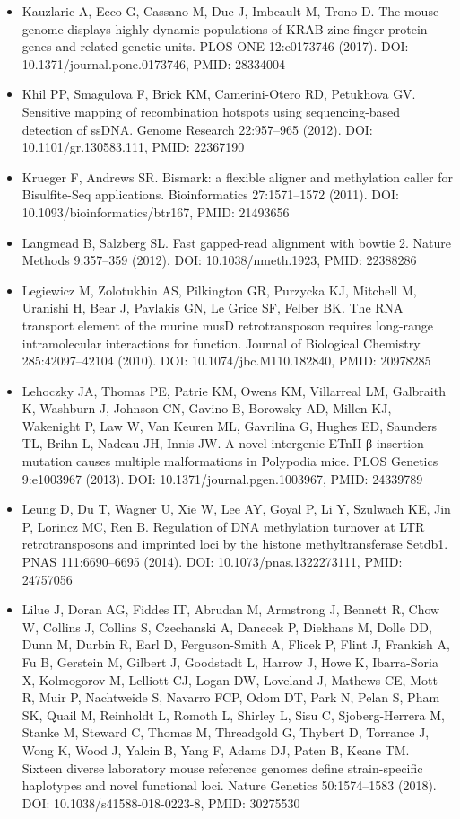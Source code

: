 \documentclass[11pt,a4paper]{article}
\begin{document}
\begin{itemize}
\item Kauzlaric A, Ecco G, Cassano M, Duc J, Imbeault M, Trono D. The mouse genome displays highly dynamic populations of KRAB-zinc finger protein genes and related genetic units. PLOS ONE 12:e0173746 (2017). DOI: 10.1371/journal.pone.0173746, PMID: 28334004
\item Khil PP, Smagulova F, Brick KM, Camerini-Otero RD, Petukhova GV. Sensitive mapping of recombination hotspots using sequencing-based detection of ssDNA. Genome Research 22:957–965 (2012). DOI: 10.1101/gr.130583.111, PMID: 22367190
\item Krueger F, Andrews SR. Bismark: a flexible aligner and methylation caller for Bisulfite-Seq applications. Bioinformatics 27:1571–1572 (2011). DOI: 10.1093/bioinformatics/btr167, PMID: 21493656
\item Langmead B, Salzberg SL. Fast gapped-read alignment with bowtie 2. Nature Methods 9:357–359 (2012). DOI: 10.1038/nmeth.1923, PMID: 22388286
\item Legiewicz M, Zolotukhin AS, Pilkington GR, Purzycka KJ, Mitchell M, Uranishi H, Bear J, Pavlakis GN, Le Grice SF, Felber BK. The RNA transport element of the murine musD retrotransposon requires long-range intramolecular interactions for function. Journal of Biological Chemistry 285:42097–42104 (2010). DOI: 10.1074/jbc.M110.182840, PMID: 20978285
\item Lehoczky JA, Thomas PE, Patrie KM, Owens KM, Villarreal LM, Galbraith K, Washburn J, Johnson CN, Gavino B, Borowsky AD, Millen KJ, Wakenight P, Law W, Van Keuren ML, Gavrilina G, Hughes ED, Saunders TL, Brihn L, Nadeau JH, Innis JW. A novel intergenic ETnII-β insertion mutation causes multiple malformations in Polypodia mice. PLOS Genetics 9:e1003967 (2013). DOI: 10.1371/journal.pgen.1003967, PMID: 24339789
\item Leung D, Du T, Wagner U, Xie W, Lee AY, Goyal P, Li Y, Szulwach KE, Jin P, Lorincz MC, Ren B. Regulation of DNA methylation turnover at LTR retrotransposons and imprinted loci by the histone methyltransferase Setdb1. PNAS 111:6690–6695 (2014). DOI: 10.1073/pnas.1322273111, PMID: 24757056
\item Lilue J, Doran AG, Fiddes IT, Abrudan M, Armstrong J, Bennett R, Chow W, Collins J, Collins S, Czechanski A, Danecek P, Diekhans M, Dolle DD, Dunn M, Durbin R, Earl D, Ferguson-Smith A, Flicek P, Flint J, Frankish A, Fu B, Gerstein M, Gilbert J, Goodstadt L, Harrow J, Howe K, Ibarra-Soria X, Kolmogorov M, Lelliott CJ, Logan DW, Loveland J, Mathews CE, Mott R, Muir P, Nachtweide S, Navarro FCP, Odom DT, Park N, Pelan S, Pham SK, Quail M, Reinholdt L, Romoth L, Shirley L, Sisu C, Sjoberg-Herrera M, Stanke M, Steward C, Thomas M, Threadgold G, Thybert D, Torrance J, Wong K, Wood J, Yalcin B, Yang F, Adams DJ, Paten B, Keane TM. Sixteen diverse laboratory mouse reference genomes define strain-specific haplotypes and novel functional loci. Nature Genetics 50:1574–1583 (2018). DOI: 10.1038/s41588-018-0223-8, PMID: 30275530

\end{itemize}
\end{document}
